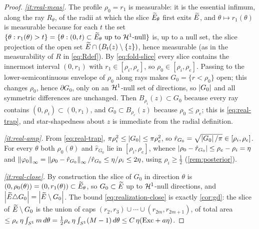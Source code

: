 \begin{proof}
\emph{\ref{it:real-meas}.} The profile $\rho_0=r_1$ is measurable: it is the
essential infimum, along the ray $R_\theta$, of the radii at which the slice
$\widetilde{E}_\theta$ first exits $\widetilde{E}$, and $\theta\mapsto r_1(\theta)$ is
measurable because for each $t$ the set $\{\theta:r_1(\theta)>t\}=\{\theta:
(0,t)\subset\widetilde{E}_\theta\ \text{up to }\mathcal{H}^1\text{-null}\}$ is, up to a null
set, the slice projection of the open set $\widetilde{E}\cap(B_t(z)\setminus\left\{z\right\})$,
hence measurable (as in the measurability of $R$ in \eqref{eq:Rdef}). By
\eqref{eq:fold-slice} every slice contains the innermost interval $(0,r_1)$
with $r_1\in[\rho_i,\rho_e]$, so $\rho_0\in[\rho_i,\rho_e]$. Passing to the
lower-semicontinuous envelope of $\rho_0$ along rays makes
$G_0=\{r<\rho_0\}$ open; this changes $\rho_0$, hence $\partial G_0$, only on
an $\mathcal{H}^1$-null set of directions, so $\left\lvert G_0\right\rvert$ and all symmetric
differences are unchanged. Then $B_{\rho_i}(z)\subset G_0$ because every ray
contains $(0,\rho_i)\subset(0,r_1)$, and $G_0\subset B_{\rho_e}(z)$ because
$\rho_0\le\rho_e$; this is \eqref{eq:real-trap}, and star-shapedness about
$z$ is immediate from the radial definition.

\emph{\ref{it:real-amp}.} From \eqref{eq:real-trap},
$\pi\rho_i^2\le\left\lvert G_0\right\rvert\le\pi\rho_e^2$, so $\hat r_{G_0}=
\sqrt{\left\lvert G_0\right\rvert/\pi}\in[\rho_i,\rho_e]$. For every $\theta$ both
$\rho_0(\theta)$ and $\hat r_{G_0}$ lie in $[\rho_i,\rho_e]$, whence
$\left\lvert\rho_0-\hat r_{G_0}\right\rvert\le\rho_e-\rho_i=\eta$ and
$\left\lVert\varphi_0\right\rVert_\infty=\left\lVert\rho_0-\hat r_{G_0}\right\rVert_\infty/\hat r_{G_0}\le
\eta/\rho_i\le2\eta$, using $\rho_i\ge\tfrac12$ (\cref{rem:posterior}).

\emph{\ref{it:real-close}.} By construction the slice of $G_0$ in direction
$\theta$ is $(0,\rho_0(\theta))=(0,r_1(\theta))\subset\widetilde{E}_\theta$, so
$G_0\subset\widetilde{E}$ up to $\mathcal{H}^1$-null directions, and
$\left\lvert\widetilde{E}\triangle G_0\right\rvert=\left\lvert\widetilde{E}\setminus G_0\right\rvert$. The bound
\eqref{eq:realization-close} is exactly \cref{cor:gd}: the slice of
$\widetilde{E}\setminus G_0$ is the union of caps
$(r_2,r_3)\cup\cdots\cup(r_{2m},r_{2m+1})$, of total area
$\le\rho_e\,\eta\int_{S^1}m\,d\theta=\tfrac12\rho_e\,\eta\int_{S^1}(M-1)\,
d\theta\le C\,\eta(\mathrm{Exc}+a\eta)$.
\end{proof}


